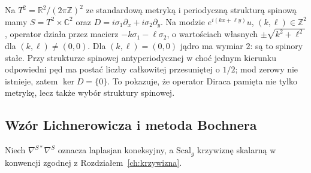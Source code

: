 \begin{przyklad}
\label{prz:dirac-torus}
Na $T^2=\mathbb R^2/(2\pi\mathbb Z)^2$ ze standardową
metryką i periodyczną strukturą spinową mamy
$S=T^2\times\mathbb C^2$ oraz
$D=i\sigma_1\partial_x+i\sigma_2\partial_y$.
Na modzie $e^{i(kx+\ell y)}u$,
$(k,\ell)\in\mathbb Z^2$, operator działa przez
macierz $-k\sigma_1-\ell\sigma_2$, o wartościach
własnych $\pm\sqrt{k^2+\ell^2}$ dla $(k,\ell)\ne(0,0)$.
Dla $(k,\ell)=(0,0)$ jądro ma wymiar $2$:
są to spinory stałe. Przy strukturze spinowej
antyperiodycznej w choć jednym kierunku odpowiedni
pęd ma postać liczby całkowitej przesuniętej o $1/2$;
mod zerowy nie istnieje, zatem $\ker D=\{0\}$.
To pokazuje, że operator Diraca pamięta nie tylko
metrykę, lecz także wybór struktury spinowej.
\end{przyklad}

\subsection{Wzór Lichnerowicza i metoda Bochnera}

Niech $\nabla^{S*}\nabla^S$ oznacza laplasjan koneksyjny,
a $\mathrm{Scal}_g$ krzywiznę skalarną w konwencji
zgodnej z Rozdziałem~\ref{ch:krzywizna}.

